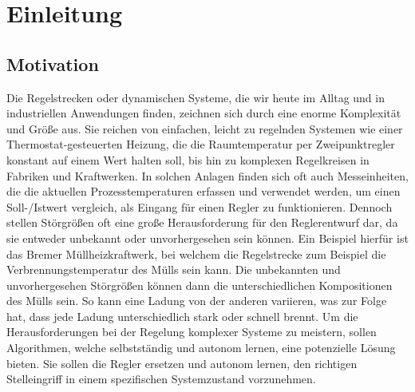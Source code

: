 \documentclass[]{iat}
\begin{document}
\graphicspath{{./project_graphics/}}

% 

\tableofcontents

\newpage

\chapter{Einleitung} \label{sec:einleitung}
\section{Motivation} \label{sec:motivation}
Die Regelstrecken oder dynamischen Systeme, die wir heute im Alltag und in industriellen Anwendungen finden, zeichnen sich durch eine enorme Komplexität und Größe aus. Sie reichen von einfachen, leicht zu regelnden Systemen wie einer Thermostat-gesteuerten Heizung, die die Raumtemperatur per Zweipunktregler konstant auf einem Wert halten soll, bis hin zu komplexen Regelkreisen in Fabriken und Kraftwerken. In solchen Anlagen finden sich oft auch Messeinheiten, die die aktuellen Prozesstemperaturen erfassen und verwendet werden, um einen Soll-/Istwert vergleich, als Eingang für einen Regler zu funktionieren. Dennoch stellen Störgrößen oft eine große Herausforderung für den Reglerentwurf dar, da sie entweder unbekannt oder unvorhergesehen sein können. Ein Beispiel hierfür ist das Bremer Müllheizkraftwerk, bei welchem die Regelstrecke zum Beispiel die Verbrennungstemperatur des Mülls sein kann. Die unbekannten und unvorhergesehen Störgrößen können dann die unterschiedlichen Kompositionen des Mülls sein. So kann eine Ladung von der anderen variieren, was zur Folge hat, dass jede Ladung unterschiedlich stark oder schnell brennt. Um die Herausforderungen bei der Regelung komplexer Systeme zu meistern, sollen Algorithmen, welche selbstständig und autonom lernen, eine potenzielle Lösung bieten. Sie sollen die Regler ersetzen und autonom lernen, den richtigen Stelleingriff in einem spezifischen Systemzustand vorzunehmen.
\end{document}
